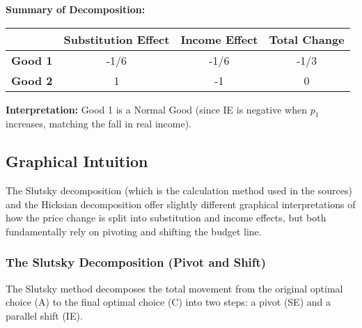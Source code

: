 \documentclass{article}
\begin{document}
\textbf{Summary of Decomposition:}
\begin{center}
\begin{tabular}{@{}lccc@{}}
\toprule
 & Substitution Effect & Income Effect & Total Change \\
\midrule
\textbf{Good 1} & -1/6 & -1/6 & -1/3 \\
\textbf{Good 2} & 1 & -1 & 0 \\
\bottomrule

\end{tabular}

\end{center}

\textbf{Interpretation:} Good 1 is a Normal Good (since IE is negative when $p_1$ increases, matching the fall in real income).

\subsection{Graphical Intuition}

The Slutsky decomposition (which is the calculation method used in the sources) and the Hicksian decomposition offer slightly different graphical interpretations of how the price change is split into substitution and income effects, but both fundamentally rely on pivoting and shifting the budget line.

\subsubsection*{The Slutsky Decomposition (Pivot and Shift)}

The Slutsky method decomposes the total movement from the original optimal choice (A) to the final optimal choice (C) into two steps: a pivot (SE) and a parallel shift (IE).
\end{document}

